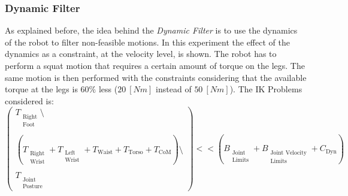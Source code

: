 \subsubsection{Dynamic Filter}
As explained before, the idea behind the \emph{Dynamic Filter} is to use the dynamics of the robot to filter non-feasible motions. In this experiment the effect of the dynamics as a constraint, at the velocity level, is shown. The robot has to perform a squat motion that requires a certain amount of torque on the legs. The same motion is then performed with the constraints considering that the available torque at the legs is $60\%$  less ($20 \ [Nm]$ instead of $50 \ [Nm]$). 
The IK Problems considered is:
\begin{equation}
\begin{pmatrix}
T_{\substack{\text{Right}\\\text{Foot}}}\setminus\\
\\
\left(T_{\substack{\text{Right}\\\text{Wrist}}} + T_{\substack{\text{Left}\\\text{Wrist}}} + T_\text{Waist} + T_\text{Torso} + T_\text{CoM}\right)\setminus\\ 
\\
T_{\substack{\text{Joint}\\\text{Posture}}}
\end{pmatrix}
<< \left(B_{\substack{\text{Joint}\\\text{Limits}}} + B_{\substack{\text{Joint Velocity}\\\text{Limits}}} + C_\text{Dyn}\right)
\end{equation}

